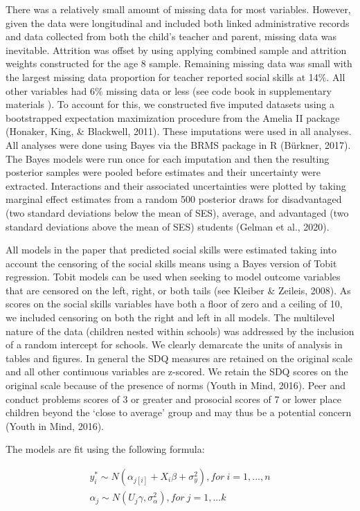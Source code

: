 \documentclass[
  english,
  man]{apa6}
\begin{document}
There was a relatively small amount of missing data for most variables. However, given the data were longitudinal and included both linked administrative records and data collected from both the child's teacher and parent, missing data was inevitable. Attrition was offset by using applying combined sample and attrition weights constructed for the age 8 sample. Remaining missing data was small with the largest missing data proportion for teacher reported social skills at 14\%. All other variables had 6\% missing data or less (see code book in supplementary materials ). To account for this, we constructed five imputed datasets using a bootstrapped expectation maximization procedure from the Amelia II package (Honaker, King, \& Blackwell, 2011). These imputations were used in all analyses. All analyses were done using Bayes via the BRMS package in R (Bürkner, 2017). The Bayes models were run once for each imputation and then the resulting posterior samples were pooled before estimates and their uncertainty were extracted. Interactions and their associated uncertainties were plotted by taking marginal effect estimates from a random 500 posterior draws for disadvantaged (two standard deviations below the mean of SES), average, and advantaged (two standard deviations above the mean of SES) students (Gelman et al., 2020).

All models in the paper that predicted social skills were estimated taking into account the censoring of the social skills means using a Bayes version of Tobit regression. Tobit models can be used when seeking to model outcome variables that are censored on the left, right, or both tails (see Kleiber \& Zeileis, 2008). As scores on the social skills variables have both a floor of zero and a ceiling of 10, we included censoring on both the right and left in all models. The multilevel nature of the data (children nested within schools) was addressed by the inclusion of a random intercept for schools. We clearly demarcate the units of analysis in tables and figures. In general the SDQ measures are retained on the original scale and all other continuous variables are z-scored. We retain the SDQ scores on the original scale because of the presence of norms (Youth in Mind, 2016). Peer and conduct problems scores of 3 or greater and prosocial scores of 7 or lower place children beyond the `close to average' group and may thus be a potential concern (Youth in Mind, 2016).

The models are fit using the following formula:

\[
\begin{split}
y^{*}_{i} \sim N(\alpha_{j[i]} + X_i\beta + \sigma^{2}_{y}), for~i = 1,...,n \\
\alpha_{j} \sim N(U_j \gamma, \sigma^{2}_{\alpha}), for~j = 1,...k
\end{split}
\]
\end{document}
